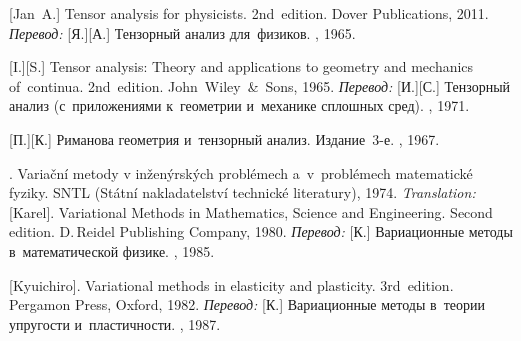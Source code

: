 \begin{thebibliography}{123}
\begin{otherlanguage}{russian}
[Jan~A.] Tensor analysis for physicists. 2nd~edition. Dover Publications, 2011. 
\emph{Перевод:} [Я.][А.] Тензорный анализ для~физиков. \naukapublisher, 1965. 

[I.][S.] Tensor analysis: Theory and applications to geometry and mechanics of~continua. 2nd~edition. John~Wiley~\&~Sons, 1965. 
\emph{Перевод:} [И.][С.] Тензорный анализ (с~приложениями к~геометрии и~механике сплошных сред). \naukapublisher, 1971. 

[П.][К.] Риманова геометрия и~тензорный анализ. Издание~3\hbox{-}е. \naukapublisher, 1967. 

%
%



. Varia\v{c}ní metody v in\v{z}en\'{y}rsk\'{y}ch probl\'{e}mech a~v~pro\-bl\'{e}\-mech matematick\'{e} fyziky. SNTL (St\'{a}tní nakladatelství technick\'{e} literatury), 1974. 
\emph{Translation:}
[Karel]. Variational Methods in Mathematics, Science and Engineering. Second edition. D.\,Reidel Publishing Company, 1980. 
\emph{Перевод:}
[К.] Вариационные методы в~математической физике. \mirpublisher, 1985. 

[Kyuichiro]. Variational methods in elasticity and plasticity. 3rd~edition. Pergamon Press, Oxford, 1982. 
\emph{Перевод:} [К.] Вариационные методы в~теории упругости и~пластичности. \mirpublisher, 1987. 


\end{otherlanguage}
\end{thebibliography}
